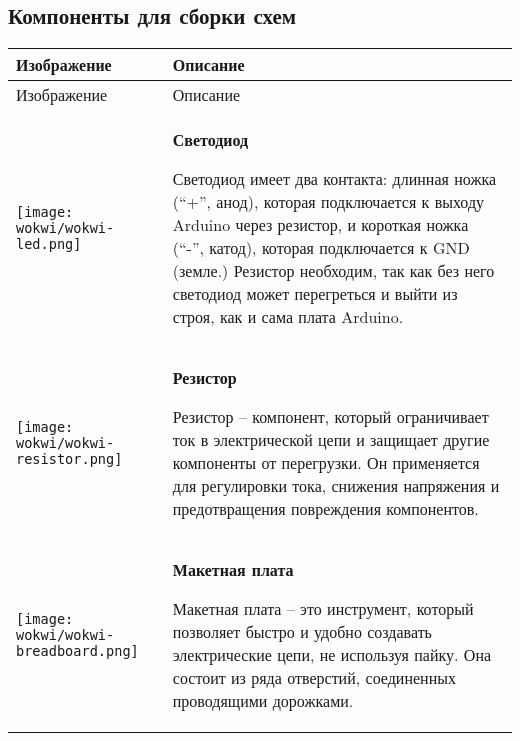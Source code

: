 \documentclass[../sparc.tex]{subfiles}
\begin{document}
\newpage
\subsection{Компоненты для сборки схем}

\begin{longtable}{|>{
      \centering\arraybackslash
    }p{3cm}|>{
      \centering\arraybackslash}p{8cm}|
  }
\hline
Изображение & Описание \\ \hline
\endfirsthead

\hline
Изображение & Описание \\ \hline
\endhead

\hline
\parbox[t][1.4cm][c]{2cm}{\centering \vspace{1cm}
  \texttt{[image: wokwi/wokwi-led.png]}} &
\parbox[t][3cm][t]{8cm}{\centering \textbf{Светодиод}\\ \raggedright

  Светодиод имеет два контакта: длинная ножка (``+'', анод), которая
  подключается к выходу Arduino через резистор, и короткая ножка (``-'', катод),
  которая подключается к GND (земле.)  Резистор необходим, так как без него
  светодиод может перегреться и выйти из строя, как и сама плата Arduino.

} \\  \hline

\parbox[t][0,5cm][c]{2cm}{\centering \vspace{1cm}
  \texttt{[image: wokwi/wokwi-resistor.png]}} &
\parbox[t][2.6cm][t]{8cm}{\centering \textbf{Резистор}\\ \raggedright

  Резистор -- компонент, который ограничивает ток в электрической цепи и защищает
  другие компоненты от перегрузки.  Он применяется для регулировки тока, снижения
  напряжения и предотвращения повреждения компонентов.

} \\  \hline

\parbox[t][2,3cm][c]{2cm}{\centering \vspace{0.8cm}
  \texttt{[image: wokwi/wokwi-breadboard.png]}} &
\parbox[t][3.9cm][t]{8cm}{\centering \textbf{Макетная плата}\\ \raggedright

  Макетная плата -- это инструмент, который позволяет быстро и удобно создавать
  электрические цепи, не используя пайку.  Она состоит из ряда отверстий,
  соединенных проводящими дорожками.

}
\end{longtable}
\end{document}
